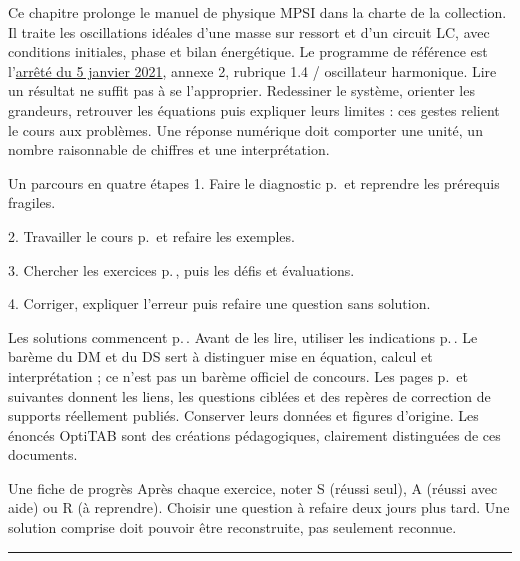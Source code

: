 \thispagestyle{mpsiFront}
Ce chapitre prolonge le manuel de physique MPSI dans la charte de la collection. Il traite les oscillations idéales d’une masse sur ressort et d’un circuit LC, avec conditions initiales, phase et bilan énergétique. Le programme de référence est l’\href{https://www.education.gouv.fr/bo/21/Special1/ESRS2035779A.htm}{arrêté du 5 janvier 2021}, annexe 2, rubrique 1.4 / oscillateur harmonique.
Lire un résultat ne suffit pas à se l’approprier. Redessiner le système, orienter les grandeurs, retrouver les équations puis expliquer leurs limites : ces gestes relient le cours aux problèmes. Une réponse numérique doit comporter une unité, un nombre raisonnable de chiffres et une interprétation.
\begin{loi}{Un parcours en quatre étapes}
1. Faire le diagnostic p.\,\pageref{diagnostic} et reprendre les prérequis fragiles.\par
2. Travailler le cours p.\,\pageref{cours-1} et refaire les exemples.\par
3. Chercher les exercices p.\,\pageref{td1}, puis les défis et évaluations.\par
4. Corriger, expliquer l’erreur puis refaire une question sans solution.
\end{loi}
Les solutions commencent p.\,\pageref{corr-diag}. Avant de les lire, utiliser les indications p.\,\pageref{indices}. Le barème du DM et du DS sert à distinguer mise en équation, calcul et interprétation ; ce n’est pas un barème officiel de concours.
Les pages p.\,\pageref{sources-1} et suivantes donnent les liens, les questions ciblées et des repères de correction de supports réellement publiés. Conserver leurs données et figures d’origine. Les énoncés OptiTAB sont des créations pédagogiques, clairement distinguées de ces documents.
\begin{methode}{Une fiche de progrès}
Après chaque exercice, noter S (réussi seul), A (réussi avec aide) ou R (à reprendre). Choisir une question à refaire deux jours plus tard. Une solution comprise doit pouvoir être reconstruite, pas seulement reconnue.
\end{methode}


\thispagestyle{mpsiFront}
\begingroup\setlength{\parskip}{0pt}\fontsize{10}{13.5}\selectfont
{}

\endgroup
\vspace{2mm}\hrule\vspace{2mm}


